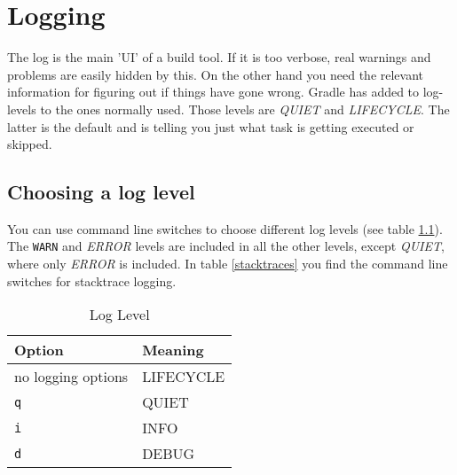 \chapter{Logging} %
\label{cha:logging}
The log is the main 'UI' of a build tool. If it is too verbose, real warnings and problems are easily hidden by this. On the other hand you need the relevant information for figuring out if things have gone wrong. Gradle has added to log-levels to the ones normally used. Those levels are \emph{QUIET} and \emph{LIFECYCLE}. The latter is the default and is telling you just what task is getting executed or skipped. 

\section{Choosing a log level} %
\label{sec:choosing_a_log_level}
You can use command line switches to choose different log levels (see table \ref{loglevels}). The \texttt{WARN} and \emph{ERROR} levels are included in all the other levels, except \emph{QUIET}, where only \emph{ERROR} is included. In table {\ref{stacktraces}} you find the command line switches for stacktrace logging.

\label{sec:command_line_switches}
\begin{table}
	\begin{center}
    \begin{tabular}{|l|l|} \hline
    Option & Meaning  \\ \hline
    no logging options & LIFECYCLE  \\ \hline
    \texttt{q} & QUIET  \\ \hline
    \texttt{i} & INFO  \\ \hline
    \texttt{d} & DEBUG \\ \hline
    \end{tabular}
	\end{center}
	\caption{Log Level}
	\label{loglevels}
\end{table}


